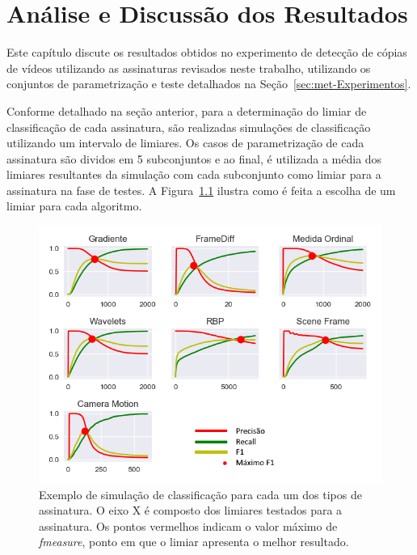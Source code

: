 
\chapter{Análise e Discussão dos Resultados}
\label{chap:resultados}

Este capítulo discute os resultados obtidos no experimento de detecção de cópias de vídeos utilizando as assinaturas revisados neste trabalho, utilizando os conjuntos de parametrização e teste detalhados na Seção~\ref{sec:met-Experimentos}.

Conforme detalhado na seção anterior, para a determinação do limiar de classificação de cada assinatura, são realizadas simulações de classificação utilizando um intervalo de limiares. Os casos de parametrização de cada assinatura são dividos em 5 subconjuntos e ao final, é utilizada a média dos limiares resultantes da simulação com cada subconjunto como limiar para a assinatura na fase de testes. A Figura~\ref{fig:todos-limiares} ilustra como é feita a escolha de um limiar para cada algoritmo.

\begin{figure}[h]
	\centering
	\caption{Exemplo de simulação de classificação para cada um dos tipos de assinatura. O eixo X é composto dos limiares testados para a assinatura. Os pontos vermelhos indicam o valor máximo de \textit{fmeasure}, ponto em que o limiar apresenta o melhor resultado.}
	\label{fig:todos-limiares}
	\includegraphics[width=\textwidth]{dados/figuras/experimentos/todos_final.png}
\end{figure}

